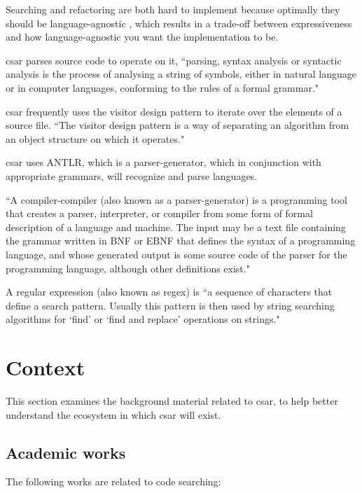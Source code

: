 \documentclass[12pt, letterpaper]{article}
\begin{document}
Searching and refactoring are both hard to implement because optimally they should be language-agnostic \autocite{mens2004survey,reiss2009semantics}, which results in a trade-off between expressiveness and how language-agnostic you want the implementation to be.

csar parses source code to operate on it, ``parsing, syntax analysis or syntactic analysis is the process of analysing a string of symbols, either in natural language or in computer languages, conforming to the rules of a formal grammar." \autocite{wikipediaparsing}

csar frequently uses the visitor design pattern to iterate over the elements of a source file.
``The visitor design pattern is a way of separating an algorithm from an object structure on which it operates." \autocite{wikipediavisitorpattern}

csar uses ANTLR, which is a parser-generator, which in conjunction with appropriate grammars, will recognize and parse languages.

``A compiler-compiler (also known as a parser-generator) is a programming tool that creates a parser, interpreter, or compiler from some form of formal description of a language and machine. The input may be a text file containing the grammar written in BNF or EBNF that defines the syntax of a programming language, and whose generated output is some source code of the parser for the programming language, although other definitions exist." \autocite{wikipediacompilercompiler}

A regular expression (also known as regex) is ``a sequence of characters that define a search pattern. Usually this pattern is then used by string searching algorithms for `find' or `find and replace' operations on strings." \autocite{wikipediaregex}

\section{Context}
This section examines the background material related to csar, to help better understand the ecosystem in which csar will exist.

\subsection{Academic works}
The following works are related to code searching:
\end{document}
